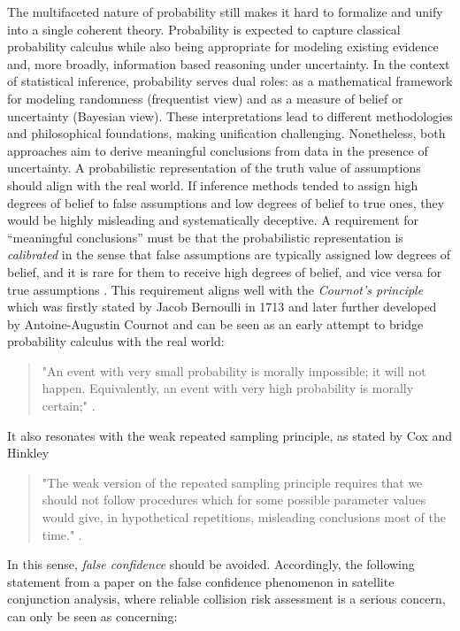 \documentclass[
]{report}
\theoremstyle{definition}
\begin{document}
The multifaceted nature of probability still makes it hard to formalize
and unify into a single coherent theory. Probability is expected to
capture classical probability calculus while also being appropriate for
modeling existing evidence and, more broadly, information based
reasoning under uncertainty. In the context of statistical inference,
probability serves dual roles: as a mathematical framework for modeling
randomness (frequentist view) and as a measure of belief or uncertainty
(Bayesian view). These interpretations lead to different methodologies
and philosophical foundations, making unification challenging.
Nonetheless, both approaches aim to derive meaningful conclusions from
data in the presence of uncertainty. A probabilistic representation of
the truth value of assumptions should align with the real world. If
inference methods tended to assign high degrees of belief to false
assumptions and low degrees of belief to true ones, they would be highly
misleading and systematically deceptive. A requirement for ``meaningful
conclusions'' must be that the probabilistic representation is
\textit{calibrated} in the sense that false assumptions are typically
assigned low degrees of belief, and it is rare for them to receive high
degrees of belief, and vice versa for true assumptions
\cite{martin_false_2019}. This requirement aligns well with the
\textit{Cournot's principle} which was firstly stated by Jacob Bernoulli
in 1713 and later further developed by Antoine-Augustin Cournot and can
be seen as an early attempt to bridge probability calculus with the real
world:

\begin{quote}
"An event with very small probability is morally impossible; it will not happen. Equivalently, an event with very high probability is morally certain;" \cite{shafer_origins_2018}.
\end{quote}

It also resonates with the weak repeated sampling principle, as stated
by Cox and Hinkley

\begin{quote}
"The weak version of the repeated sampling principle requires that we should not follow procedures which for some possible parameter values would give, in hypothetical repetitions, misleading conclusions most of the time." \cite[p.~45--46]{cox_theoretical_1979}.
\end{quote}

In this sense, \textit{false confidence} should be avoided. Accordingly,
the following statement from a paper on the false confidence phenomenon
in satellite conjunction analysis, where reliable collision risk
assessment is a serious concern, can only be seen as concerning:
\end{document}
